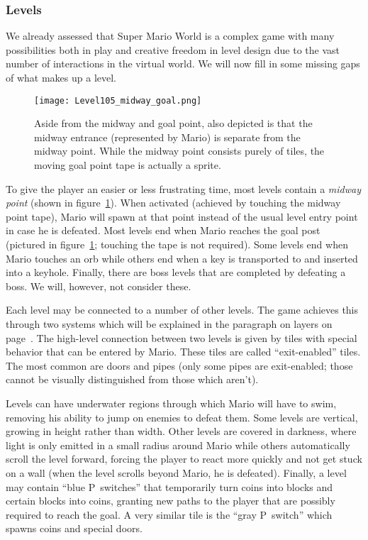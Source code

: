 \subsubsection{Levels}
\label{sec:levels}

We already assessed that Super Mario World is a complex game with many
possibilities both in play and creative freedom in level design due to
the vast number of interactions in the virtual world. We will now fill
in some missing gaps of what makes up a level.

\begin{figure}[t]
  \centering
  \texttt{[image: Level105\_midway\_goal.png]}
  \caption{Aside from the midway and goal point, also depicted is that
    the midway entrance (represented by Mario) is separate from the
    midway point. While the midway point consists purely of tiles, the
    moving goal point tape is actually a sprite.}
  \label{fig:midway-goal}
\end{figure}

To give the player an easier or less frustrating time, most levels
contain a \emph{midway point} (shown in figure~\ref{fig:midway-goal}).
When activated (achieved by touching the midway point tape), Mario
will spawn at that point instead of the usual level entry point in
case he is defeated. Most levels end when Mario reaches the goal post
(pictured in figure~\ref{fig:midway-goal}; touching the tape is not
required). Some levels end when Mario touches an orb while others end
when a key is transported to and inserted into a keyhole. Finally,
there are boss levels that are completed by defeating a boss. We will,
however, not consider these.

Each level may be connected to a number of other levels. The game
achieves this through two systems which will be explained in the
paragraph on layers on page~\pageref{par:layers}. The high-level
connection between two levels is given by tiles with special behavior
that can be entered by Mario. These tiles are called ``exit-enabled''
tiles. The most common are doors and pipes (only some pipes are
exit-enabled; those cannot be visually distinguished from those which
aren't).

Levels can have underwater regions through which Mario will have to
swim, removing his ability to jump on enemies to defeat them. Some
levels are vertical, growing in height rather than width. Other levels
are covered in darkness, where light is only emitted in a small radius
around Mario while others automatically scroll the level forward,
forcing the player to react more quickly and not get stuck on a wall
(when the level scrolls beyond Mario, he is defeated). Finally, a
level may contain ``blue P~switches'' that temporarily turn coins into
blocks and certain blocks into coins, granting new paths to the player
that are possibly required to reach the goal. A very similar tile is
the ``gray P~switch'' which spawns coins and special doors.

